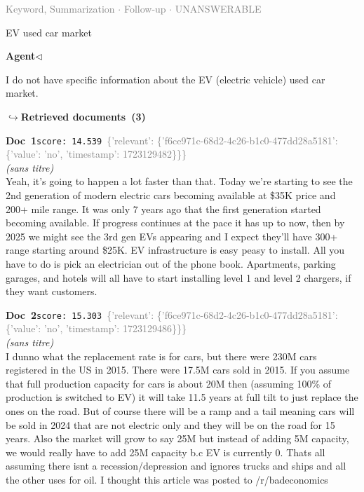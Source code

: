 \documentclass[a4paper,11pt]{article}
\begin{document}
\vspace{0.5em}
\hfill{\tiny\textcolor{gray}{Keyword, Summarization $\cdot$ Follow-up $\cdot$ UNANSWERABLE}}
\begin{userbubble}
EV used car market
\end{userbubble}
\noindent\hfill{\small\textcolor{agentcolor}{\textbf{Agent\enspace$\triangleleft$}}}
\begin{agentbubble}
I do not have specific information about the EV (electric vehicle) used car market. 
\end{agentbubble}
\noindent\hfill{\footnotesize\textcolor{doccolor}{\textbf{$\hookrightarrow$\enspace Retrieved documents~(3)}}}
\begin{docenv}
{\footnotesize\textcolor{doccolor}{\textbf{Doc~1}}}\hfill{\tiny\texttt{score:~14.539}}\ {\tiny\textcolor{gray}{\{'relevant': \{'f6ce971c-68d2-4c26-b1c0-477dd28a5181': \{'value': 'no', 'timestamp': 1723129482\}\}\}}}\\[3pt]
{\small\textit{(sans titre)}}\\[2pt]
\vspace{2pt}
{\footnotesize 
Yeah, it's going to happen a lot faster than that.  Today we're starting to see the 2nd generation of modern electric cars becoming available at \$35K price and 200+ mile range.  It was only 7 years ago that the first generation started becoming available.  If progress continues at the pace it has up to now, then by 2025 we might see the 3rd gen EVs appearing and I expect they'll have 300+ range starting around \$25K.  EV infrastructure is easy peasy to install.  All you have to do is pick an electrician out of the phone book.  Apartments, parking garages, and hotels will all have to start installing level 1 and level 2 chargers, if they want customers.}
\end{docenv}
\begin{docenv}
{\footnotesize\textcolor{doccolor}{\textbf{Doc~2}}}\hfill{\tiny\texttt{score:~15.303}}\ {\tiny\textcolor{gray}{\{'relevant': \{'f6ce971c-68d2-4c26-b1c0-477dd28a5181': \{'value': 'no', 'timestamp': 1723129486\}\}\}}}\\[3pt]
{\small\textit{(sans titre)}}\\[2pt]
\vspace{2pt}
{\footnotesize 
I dunno what the replacement rate is for cars, but there were 230M cars registered in the US in 2015. There were 17.5M cars sold in 2015. If you assume that full production capacity for cars is about 20M then (assuming 100\% of production is switched to EV) it will take 11.5 years at full tilt to just replace the ones on the road.   But of course there will be a ramp and a tail meaning cars will be sold in 2024 that are not electric only and they will be on the road for 15 years.   Also the market will grow to say 25M but instead of adding 5M capacity, we would really have to add 25M capacity b.c EV is currently 0.   Thats all assuming there isnt a recession/depression and ignores trucks and ships and all the other uses for oil.   I thought this article was posted to /r/badeconomics}
\end{docenv}
\end{document}
